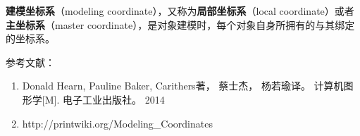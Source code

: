 
\textbf{建模坐标系}（modeling coordinate），又称为\textbf{局部坐标系}（local coordinate）或者\textbf{主坐标系}（master coordinate），是对象建模时，每个对象自身所拥有的与其绑定的坐标系。





参考文献：
\begin{enumerate}
\item Donald Hearn, Pauline Baker, Carithers著， 蔡士杰， 杨若瑜译。 计算机图形学[M]. 电子工业出版社。 2014
\item http://printwiki.org/Modeling\_Coordinates
\end{enumerate}